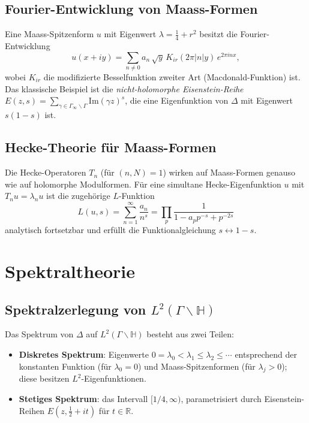 \documentclass[12pt,a4paper]{amsart}
\theoremstyle{definition}
\newcommand{\HH}{\mathbb{H}}
\newcommand{\RR}{\mathbb{R}}
\newcommand{\im}{\mathrm{Im}}
\begin{document}
\subsection{Fourier-Entwicklung von Maass-Formen}

Eine Maass-Spitzenform $u$ mit Eigenwert $\lambda = \frac{1}{4}+r^2$ besitzt die
Fourier-Entwicklung
\[
u(x+iy) = \sum_{n \neq 0} a_n\, \sqrt{y}\, K_{ir}(2\pi|n|y)\, e^{2\pi i n x},
\]
wobei $K_{ir}$ die modifizierte Besselfunktion zweiter Art (Macdonald-Funktion) ist.
Das klassische Beispiel ist die \emph{nicht-holomorphe Eisenstein-Reihe}
$E(z,s) = \sum_{\gamma \in \Gamma_\infty \backslash \Gamma} \im(\gamma z)^s$,
die eine Eigenfunktion von $\Delta$ mit Eigenwert $s(1-s)$ ist.

\subsection{Hecke-Theorie für Maass-Formen}

Die Hecke-Operatoren $T_n$ (für $(n,N)=1$) wirken auf Maass-Formen genauso wie
auf holomorphe Modulformen. Für eine simultane Hecke-Eigenfunktion $u$ mit
$T_n u = \lambda_n u$ ist die zugehörige $L$-Funktion
\[
L(u, s) = \sum_{n=1}^\infty \frac{a_n}{n^s} = \prod_p \frac{1}{1 - a_p p^{-s} + p^{-2s}}
\]
analytisch fortsetzbar und erfüllt die Funktionalgleichung $s \leftrightarrow 1-s$.

\section{Spektraltheorie}
\label{sec:spektral}

\subsection{Spektralzerlegung von \texorpdfstring{$L^2(\Gamma \backslash \HH)$}{L2}}

Das Spektrum von $\Delta$ auf $L^2(\Gamma \backslash \HH)$ besteht aus zwei Teilen:
\begin{itemize}
\item \textbf{Diskretes Spektrum}: Eigenwerte $0 = \lambda_0 < \lambda_1 \leq \lambda_2 \leq \cdots$
  entsprechend der konstanten Funktion (für $\lambda_0 = 0$) und Maass-Spitzenformen
  (für $\lambda_j > 0$); diese besitzen $L^2$-Eigenfunktionen.
\item \textbf{Stetiges Spektrum}: das Intervall $[1/4, \infty)$, parametrisiert durch
  Eisenstein-Reihen $E(z, \tfrac{1}{2}+it)$ für $t \in \RR$.
\end{itemize}
\end{document}
